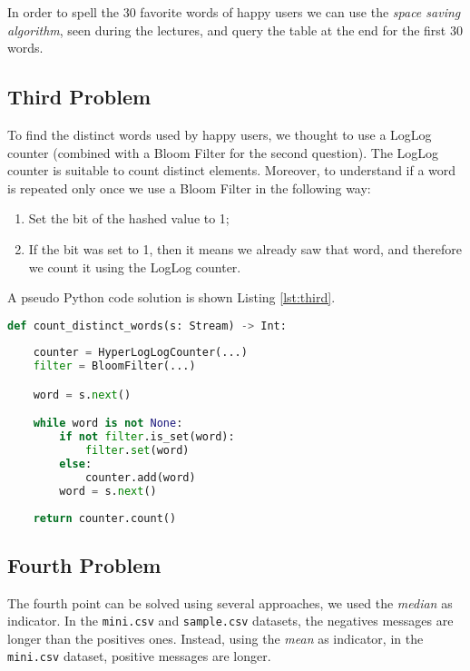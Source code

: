 \documentclass{article}
\begin{document}
\noindent In order to spell the 30 favorite words of happy users we can use the \textit{space saving algorithm}, seen during the lectures, and query the table at the
end for the first 30 words. \newline

\subsection{Third Problem}

\noindent To find the distinct words used by happy users, we thought to use a LogLog counter (combined with a Bloom Filter for the second question).
The LogLog counter is suitable to count distinct elements. Moreover, to understand if a word is repeated only once we use a Bloom Filter in the following way:
\begin{enumerate}
\item Set the bit of the hashed value to 1;
\item If the bit was set to 1, then it means we already saw that word, and therefore we count it using the LogLog counter.
\end{enumerate}
A pseudo Python code solution is shown Listing \ref{lst:third}.

\begin{lstlisting}[language=Python,caption="Pseudo-Code for the third point",label={lst:third}]
def count_distinct_words(s: Stream) -> Int:
    
    counter = HyperLogLogCounter(...)
    filter = BloomFilter(...)

    word = s.next()

    while word is not None:
        if not filter.is_set(word):
            filter.set(word)
        else:
            counter.add(word)
        word = s.next()
    
    return counter.count()

\end{lstlisting}

\subsection{Fourth Problem}

\noindent The fourth point can be solved using several approaches, we used the \textit{median} as indicator. In the \verb+mini.csv+ and \verb+sample.csv+ datasets, the negatives messages are longer than the positives ones.
Instead, using the \textit{mean} as indicator, in the \verb+mini.csv+ dataset, positive messages are longer.
\end{document}
